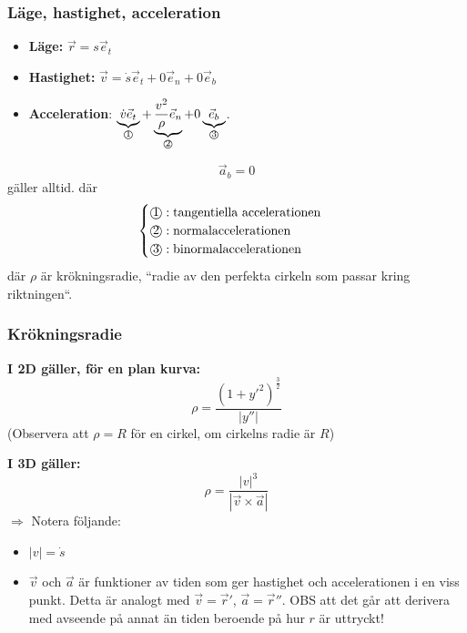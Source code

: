 \documentclass{article}
\newenvironment{ankiflashcard}[1]{}{}
\newcommand{\numbercircle}[1]{
\text{\textcircled{#1}}
}
\newcommand{\numbercirclewithunderbrace}[2]{
\underbrace{#1}_{\numbercircle{#2}}
}
\begin{document}
\begin{paracol}{2}
\begin{ankiflashcard}{Ange ekvationer för läge, hastighet och acceleration i naturliga komponenter.}
\subsubsection{Läge, hastighet, acceleration}
\begin{itemize}
    \item \textbf{Läge:} $\vec r = s \vec e_t$
    \item \textbf{Hastighet:} $\vec v = \dot s \vec e_t+0 \vec e_n + 0 \vec e_b$
    \item \textbf{Acceleration}: $\numbercirclewithunderbrace{\dot v \vec e_t}{1} + \numbercirclewithunderbrace{\frac{v^2}{\rho} \vec e_n}{2} + 0\numbercirclewithunderbrace{\vec e_b}{3}$. 
\end{itemize}
$$\vec a_b = 0$$ gäller alltid.
där $$\begin{cases}
    \numbercircle{1}: \text{tangentiella accelerationen}\\
    \numbercircle{2}: \text{normalaccelerationen} \\
    \numbercircle{3}: \text{binormalaccelerationen} \\
\end{cases}$$
där $\rho$ är krökningsradie, ``radie av den perfekta cirkeln som passar kring riktningen``.
\end{ankiflashcard}

\subsubsection{Krökningsradie}

\begin{ankiflashcard}{Ställ upp formeln för krökningsradie (2D)}
\textbf{I 2D gäller, för en plan kurva:}
$$
\rho = \frac{(1+y'^2)^{\frac{3}{2}}}{\left| y'' \right|}
$$
(Observera att $\rho = R$ för en cirkel, om cirkelns radie är $R$)
\end{ankiflashcard}

\begin{ankiflashcard}{Ställ upp formeln för krökningsradie (3D)}
    
\textbf{I 3D gäller:}
$$
\rho = \frac{\left|v\right|^3}{\left| \vec v \times \vec a \right|}
$$
$\Rightarrow$ Notera följande:
\begin{itemize}
    \item $\left|v\right|=\dot s$
    \item $\vec v$ och $\vec a$ är funktioner av tiden som ger hastighet och accelerationen i en viss punkt. Detta är analogt med $\vec v = \vec r'$, $\vec a = \vec r''$. OBS att det går att derivera med avseende på annat än tiden beroende på hur $r$ är uttryckt!
\end{itemize}
\end{ankiflashcard}


\end{paracol}
\end{document}
